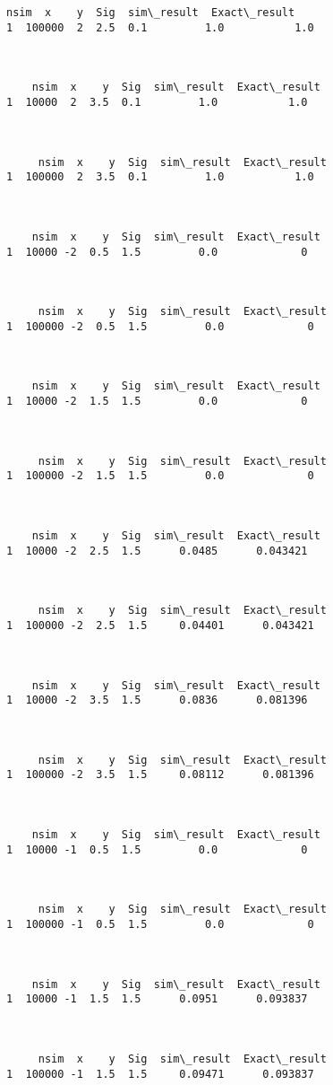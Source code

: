 \documentclass[12pt]{article}
\begin{document}
\begin{Verbatim}[commandchars=\\\{\}]
     nsim  x    y  Sig  sim\_result  Exact\_result
1  100000  2  2.5  0.1         1.0           1.0



    nsim  x    y  Sig  sim\_result  Exact\_result
1  10000  2  3.5  0.1         1.0           1.0



     nsim  x    y  Sig  sim\_result  Exact\_result
1  100000  2  3.5  0.1         1.0           1.0



    nsim  x    y  Sig  sim\_result  Exact\_result
1  10000 -2  0.5  1.5         0.0             0



     nsim  x    y  Sig  sim\_result  Exact\_result
1  100000 -2  0.5  1.5         0.0             0



    nsim  x    y  Sig  sim\_result  Exact\_result
1  10000 -2  1.5  1.5         0.0             0



     nsim  x    y  Sig  sim\_result  Exact\_result
1  100000 -2  1.5  1.5         0.0             0



    nsim  x    y  Sig  sim\_result  Exact\_result
1  10000 -2  2.5  1.5      0.0485      0.043421



     nsim  x    y  Sig  sim\_result  Exact\_result
1  100000 -2  2.5  1.5     0.04401      0.043421



    nsim  x    y  Sig  sim\_result  Exact\_result
1  10000 -2  3.5  1.5      0.0836      0.081396



     nsim  x    y  Sig  sim\_result  Exact\_result
1  100000 -2  3.5  1.5     0.08112      0.081396



    nsim  x    y  Sig  sim\_result  Exact\_result
1  10000 -1  0.5  1.5         0.0             0



     nsim  x    y  Sig  sim\_result  Exact\_result
1  100000 -1  0.5  1.5         0.0             0



    nsim  x    y  Sig  sim\_result  Exact\_result
1  10000 -1  1.5  1.5      0.0951      0.093837



     nsim  x    y  Sig  sim\_result  Exact\_result
1  100000 -1  1.5  1.5     0.09471      0.093837




\end{Verbatim}
\end{document}
